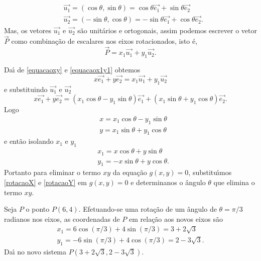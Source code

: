 \begin{align*}
  &\vec{u_1} = (\cos\theta,\sin\theta) = \cos\theta\vec{e_1} + \sin\theta\vec{e_2}\\
  &\vec{u_2} = (-\sin\theta,\cos\theta) = -\sin\theta\vec{e_1} + \cos\theta\vec{e_2}.
\end{align*}
Mas, os vetores $\vec{u_1}$ e $\vec{u_2}$ s\~ao unit\'arios e ortogonais, assim podemos escrever o vetor $\vec{P}$ como combina\c{c}\~ao de escalares nos eixos rotacionados, isto \'e,
\begin{equation}\label{equacaox1y1}
  \vec{P} = x_1\vec{u_1} + y_1\vec{u_2}.
\end{equation}

Da{\'\i} de \eqref{equacaoxy} e \eqref{equacaox1y1} obtemos
\[
  x\vec{e_1} + y\vec{e_2} = x_1\vec{u_1} + y_1\vec{u_2}
\]
e substituindo $\vec{u_1}$ e $\vec{u_2}$
\[
  x\vec{e_1} + y\vec{e_2} = (x_1\cos\theta - y_1\sin\theta)\vec{e_1} + (x_1\sin\theta + y_1\cos\theta)\vec{e_2}.
\]
Logo
\begin{align}
  &x = x_1\cos\theta - y_1\sin\theta\label{rotacaoX}\\
  &y = x_1\sin\theta + y_1\cos\theta\label{rotacaoY}
\end{align}
e ent\~ao isolando $x_1$ e $y_1$
\begin{align*}
  &x_1 = x\cos\theta + y\sin\theta\\
  &y_1 = -x\sin\theta + y\cos\theta.
\end{align*}
Portanto para eliminar o termo $xy$ da equa\c{c}\~ao $g(x,y) = 0$, substitu{\'\i}mos \eqref{rotacaoX} e \eqref{rotacaoY} em $g(x,y) = 0$ e determinanos o \^angulo $\theta$ que elimina o termo $xy$.

\begin{exemplos}
  Seja $P$ o ponto $P(6,4)$. Efetuando-se uma rota\c{c}\~ao de um \^angulo de $\theta = \pi/3$ radianos nos eixos, as coordenadas de $P$ em rela\c{c}\~ao aos novos eixos s\~ao
    \begin{align*}
      x_1 = 6\cos(\pi/3) + 4\sin(\pi/3) = 3 + 2\sqrt{3}\\
      y_1 = -6\sin(\pi/3) + 4\cos(\pi/3) = 2 - 3\sqrt{3}.
    \end{align*}
    Da{\'\i} no novo sistema $P(3 + 2\sqrt{3}, 2 - 3\sqrt{3})$.
\end{exemplos}

